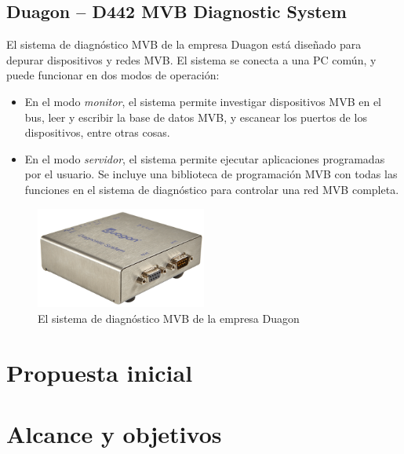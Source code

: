 \subsection{Duagon -- D442 MVB Diagnostic System}

El sistema de diagnóstico MVB de la empresa Duagon \cite{duagon} está diseñado para depurar dispositivos y redes MVB. El sistema se conecta a una PC común, y puede funcionar en dos modos de operación:

\begin{itemize}
\item En el modo \emph{monitor}, el sistema permite investigar dispositivos MVB en el bus, leer y escribir la base de datos MVB, y escanear los puertos de los dispositivos, entre otras cosas.
\item En el modo \emph{servidor}, el sistema permite ejecutar aplicaciones programadas por el usuario. Se incluye una biblioteca de programación MVB con todas las funciones en el sistema de diagnóstico para controlar una red MVB completa.
\end{itemize}

\begin{figure}[htbp]
	\centering
	\includegraphics[width=0.5\textwidth]{./Figures/duagon.png}
	\caption[Duagon -- D442 MVB Diagnostic System]{El sistema de diagnóstico MVB de la empresa Duagon}
\end{figure}


\section{Propuesta inicial}



\section{Alcance y objetivos}

